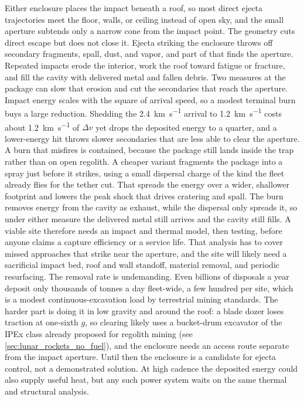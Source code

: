 \documentclass{article}
\newcommand{\deltav}{\Delta v}
\begin{document}
Either enclosure places the impact beneath a roof, so most direct ejecta trajectories meet the floor, walls, or ceiling instead of open sky, and the small aperture subtends only a narrow cone from the impact point. The geometry cuts direct escape but does not close it. Ejecta striking the enclosure throws off secondary fragments, spall, dust, and vapor, and part of that finds the aperture. Repeated impacts erode the interior, work the roof toward fatigue or fracture, and fill the cavity with delivered metal and fallen debris. Two measures at the package can slow that erosion and cut the secondaries that reach the aperture. Impact energy scales with the square of arrival speed, so a modest terminal burn buys a large reduction. Shedding the \SI{2.4}{\kilo\meter\per\second} arrival to \SI{1.2}{\kilo\meter\per\second} costs about \SI{1.2}{\kilo\meter\per\second} of $\deltav$ yet drops the deposited energy to a quarter, and a lower-energy hit throws slower secondaries that are less able to clear the aperture. A burn that misfires is contained, because the package still lands inside the trap rather than on open regolith. A cheaper variant fragments the package into a spray just before it strikes, using a small dispersal charge of the kind the fleet already flies for the tether cut. That spreads the energy over a wider, shallower footprint and lowers the peak shock that drives cratering and spall. The burn removes energy from the cavity as exhaust, while the dispersal only spreads it, so under either measure the delivered metal still arrives and the cavity still fills. A viable site therefore needs an impact and thermal model, then testing, before anyone claims a capture efficiency or a service life. That analysis has to cover missed approaches that strike near the aperture, and the site will likely need a sacrificial impact bed, roof and wall standoff, material removal, and periodic resurfacing. The removal rate is undemanding. Even billions of disposals a year deposit only thousands of tonnes a day fleet-wide, a few hundred per site, which is a modest continuous-excavation load by terrestrial mining standards. The harder part is doing it in low gravity and around the roof: a blade dozer loses traction at one-sixth $g$, so clearing likely uses a bucket-drum excavator of the IPEx class already proposed for regolith mining (see \autoref{sec:lunar_rockets_no_fuel}), and the enclosure needs an access route separate from the impact aperture. Until then the enclosure is a candidate for ejecta control, not a demonstrated solution. At high cadence the deposited energy could also supply useful heat, but any such power system waits on the same thermal and structural analysis.
\end{document}
